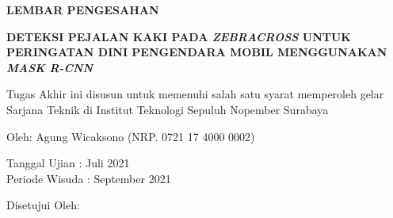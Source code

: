 \begin{center}
	\large
  \textbf{LEMBAR PENGESAHAN}
\end{center}

\thispagestyle{empty}

\begin{center}
  \textbf{DETEKSI PEJALAN KAKI PADA \textit{ZEBRACROSS} UNTUK PERINGATAN DINI PENGENDARA MOBIL MENGGUNAKAN \textit{MASK R-CNN}}
\end{center}

\begingroup
  \small

  \begin{center}
    Tugas Akhir ini disusun untuk memenuhi salah satu syarat memperoleh gelar Sarjana Teknik di Institut Teknologi Sepuluh Nopember Surabaya
  \end{center}

  \begin{center}
    Oleh: Agung Wicaksono (NRP. 0721 17 4000 0002)
  \end{center}

  \begin{center}
    Tanggal Ujian :  Juli 2021\\
    Periode Wisuda : September 2021
  \end{center}

  \begin{center}
    Disetujui Oleh:
  \end{center}

  \begingroup
    \setlength{\tabcolsep}{0pt}

